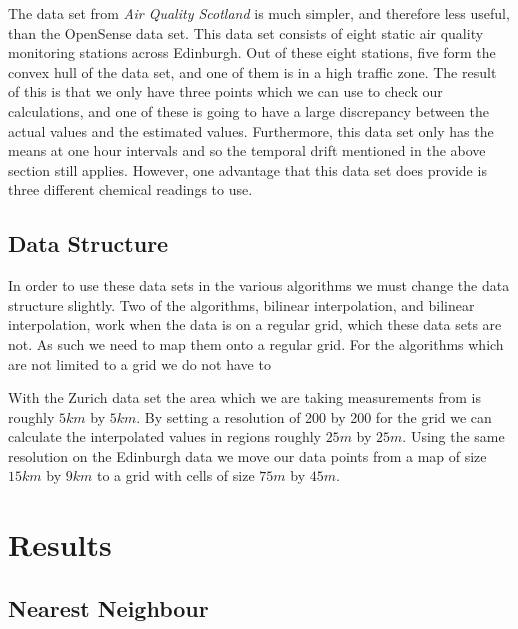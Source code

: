 				The data set from \emph{Air Quality Scotland} is much simpler, and therefore less useful, than the OpenSense data set. This data set consists of eight static air quality monitoring stations across Edinburgh. Out of these eight stations, five form the convex hull of the data set, and one of them is in a high traffic zone. The result of this is that we only have three points which we can use to check our calculations, and one of these is going to have a large discrepancy between the actual values and the estimated values. Furthermore, this data set only has the means at one hour intervals and so the temporal drift mentioned in the above section still applies. However, one advantage that this data set does provide is three different chemical readings to use. 

		\subsection{Data Structure}\label{prediction_evaluation_methodology_data_structure}
			
			In order to use these data sets in the various algorithms we must change the data structure slightly. Two of the algorithms, bilinear interpolation, and bilinear interpolation, work when the data is on a regular grid, which these data sets are not. As such we need to map them onto a regular grid. For the algorithms which are not limited to a grid we do not have to

			With the Zurich data set the area which we are taking measurements from is roughly $5km$ by $5km$. By setting a resolution of 200 by 200 for the grid we can calculate the interpolated values in regions roughly $25m$ by $25m$. Using the same resolution on the Edinburgh data we move our data points from a map of size $15km$ by $9km$ to a grid with cells of size $75m$ by $45m$. 


		

    \section{Results}\label{prediction_evaluation_results}


        \subsection{Nearest Neighbour}\label{prediction_evaluation_results_nearest_neighbour}

